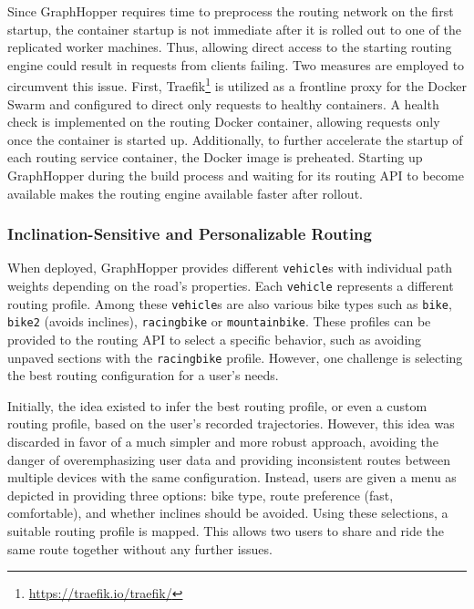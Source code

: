 Since GraphHopper requires time to preprocess the routing network on the first startup, the container startup is not immediate after it is rolled out to one of the replicated worker machines. Thus, allowing direct access to the starting routing engine could result in requests from clients failing. Two measures are employed to circumvent this issue. First, Traefik\footnote{\url{https://traefik.io/traefik/}} is utilized as a frontline proxy for the Docker Swarm and configured to direct only requests to healthy containers. A health check is implemented on the routing Docker container, allowing requests only once the container is started up. Additionally, to further accelerate the startup of each routing service container, the Docker image is preheated. Starting up GraphHopper during the build process and waiting for its routing API to become available makes the routing engine available faster after rollout. 

\subsubsection{Inclination-Sensitive and Personalizable Routing}

When deployed, GraphHopper provides different \texttt{vehicle}s with individual path weights depending on the road's properties. Each \texttt{vehicle} represents a different routing profile. Among these \texttt{vehicle}s are also various bike types such as \texttt{bike}, \texttt{bike2} (avoids inclines), \texttt{racingbike} or \texttt{mountainbike}. These profiles can be provided to the routing API to select a specific behavior, such as avoiding unpaved sections with the \texttt{racingbike} profile. However, one challenge is selecting the best routing configuration for a user's needs. 

Initially, the idea existed to infer the best routing profile, or even a custom routing profile, based on the user's recorded trajectories. However, this idea was discarded in favor of a much simpler and more robust approach, avoiding the danger of overemphasizing user data and providing inconsistent routes between multiple devices with the same configuration. Instead, users are given a menu as depicted in  providing three options: bike type, route preference (fast, comfortable), and whether inclines should be avoided. Using these selections, a suitable routing profile is mapped. This allows two users to share and ride the same route together without any further issues.

